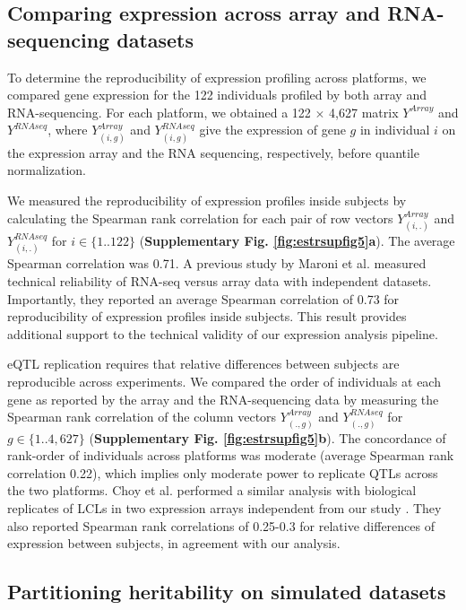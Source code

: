 \subsection{Comparing expression across array and RNA-sequencing datasets}

To determine the reproducibility of expression profiling across
platforms, we compared gene expression for the 122 individuals profiled
by both array and RNA-sequencing. For each platform, we obtained a 122
$\times$ 4,627 matrix $Y^{Array}$ and $Y^{RNAseq}$, where
$Y_{(i,g)}^{Array}$ and $Y_{(i,g)}^{RNAseq}$ give the expression of gene
$g$ in individual $i$ on the expression array and the RNA sequencing,
respectively, before quantile normalization.

We measured the reproducibility of expression profiles inside subjects
by calculating the Spearman rank correlation for each pair of row
vectors $Y_{(i,.)}^{Array}$ and $Y_{(i,.)}^{RNAseq}$ for
$i\in\{1..122\}$ (\textbf{Supplementary Fig. \ref{fig:estrsupfig5}a}). The average Spearman correlation was 0.71. A previous
study by Maroni et al. \cite{MarioniMasonManeEtAl2008} measured technical reliability of
RNA-seq versus array data with independent datasets. Importantly, they
reported an average Spearman correlation of 0.73 for reproducibility of
expression profiles inside subjects. This result provides additional
support to the technical validity of our expression analysis pipeline.

eQTL replication requires that relative differences between
subjects are reproducible across experiments. We compared the order of
individuals at each gene as reported by the array and the RNA-sequencing
data by measuring the Spearman rank correlation of the column vectors
$Y_{(.,g)}^{Array}$ and $Y_{(.,g)}^{RNAseq}$ for $g\in\{1..4,627\}$ (\textbf{Supplementary Fig. \ref{fig:estrsupfig5}b}). The
concordance of rank-order of individuals across platforms was moderate
(average Spearman rank correlation 0.22), which implies only moderate
power to replicate QTLs across the two platforms. Choy et al. performed
a similar analysis with biological replicates of LCLs in two expression
arrays independent from our study \cite{ChoyYelenskyBonakdarEtAl2008}. They also reported
Spearman rank correlations of 0.25-0.3 for relative differences of
expression between subjects, in agreement with our analysis.



\subsection{Partitioning heritability on simulated datasets}

